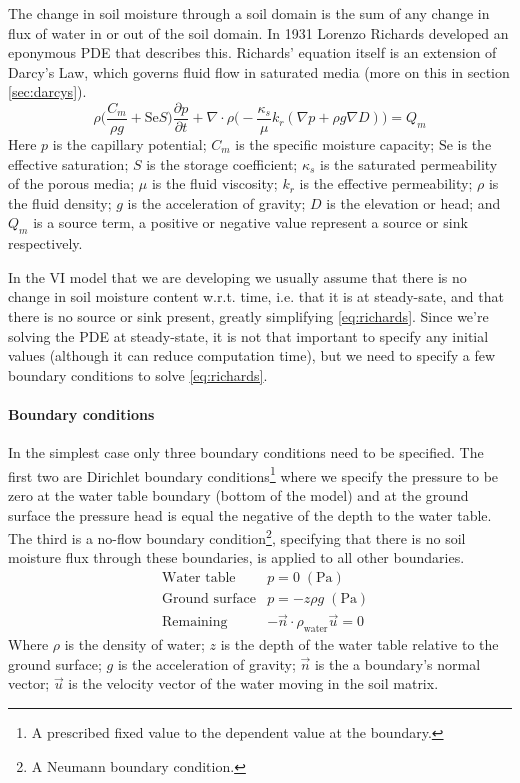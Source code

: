 The change in soil moisture through a soil domain is the sum of any change in flux of water in or out of the soil domain.
In 1931 Lorenzo Richards\cite{richards_capillary_1931} developed an eponymous PDE that describes this.
Richards' equation itself is an extension of Darcy's Law, which governs fluid flow in saturated media (more on this in section \ref{sec:darcys}).
\begin{equation}\label{eq:richards}
  \rho \Big( \frac{C_m}{\rho g} + \mathrm{Se}S \Big) \frac{\partial p}{\partial t} +
  \nabla \cdot \rho \Big( -\frac{\kappa_s}{\mu} k_r (\nabla p + \rho g \nabla D)\Big) =
  Q_m
\end{equation}
Here $p$ is the capillary potential; $C_m$ is the specific moisture capacity; $\mathrm{Se}$ is the effective saturation; $S$ is the storage coefficient; $\kappa_s$ is the saturated permeability of the porous media; $\mu$ is the fluid viscosity; $k_r$ is the effective permeability; $\rho$ is the fluid density; $g$ is the acceleration of gravity; $D$ is the elevation or head; and $Q_m$ is a source term, a positive or negative value represent a source or sink respectively.\par

In the VI model that we are developing we usually assume that there is no change in soil moisture content w.r.t. time, i.e. that it is at steady-sate, and that there is no source or sink present, greatly simplifying \eqref{eq:richards}.
Since we're solving the PDE at steady-state, it is not that important to specify any initial values (although it can reduce computation time), but we need to specify a few boundary conditions to solve \eqref{eq:richards}.

\paragraph{Boundary conditions}

In the simplest case only three boundary conditions need to be specified.
The first two are Dirichlet boundary conditions\footnote{A prescribed fixed value to the dependent value at the boundary.} where we specify the pressure to be zero at the water table boundary (bottom of the model) and at the ground surface the pressure head is equal the negative of the depth to the water table.
The third is a no-flow boundary condition\footnote{A Neumann boundary condition.}, specifying that there is no soil moisture flux through these boundaries, is applied to all other boundaries.
\begin{align}\label{eq:richards_bc}
  &\text{Water table} &p = 0 \; \mathrm{(Pa)}\\
  &\text{Ground surface} &p =  -z\rho g \; \mathrm{(Pa)} \\
  &\text{Remaining} &-\vec{n}\cdot\rho_\mathrm{water}\vec{u} = 0
\end{align}
Where $\rho$ is the density of water; $z$ is the depth of the water table relative to the ground surface; $g$ is the acceleration of gravity; $\vec{n}$ is the a boundary's normal vector; $\vec{u}$ is the velocity vector of the water moving in the soil matrix.\par
